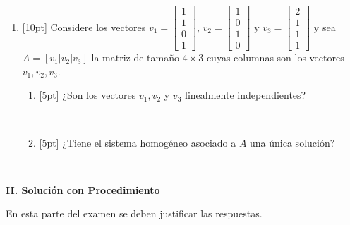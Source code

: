 \documentclass[11pt]{article}
\newcommand{\sino}{\fbox{Sí}\ \fbox{No}}
\begin{document}
\begin{enumerate}
\item{}[10pt] Considere los vectores $v_1 = \begin{bmatrix}1\\1\\0\\1\end{bmatrix}$, $v_2 = \begin{bmatrix}1\\0\\1\\0\end{bmatrix}$ y $v_3 = \begin{bmatrix}2\\1\\1\\1\end{bmatrix}$ y sea $A = [v_1|v_2|v_3]$ la matriz de tamaño $4\times 3$ cuyas columnas son los vectores $v_1,v_2,v_3$.
\begin{enumerate}
\item{}[5pt] ¿Son los vectores $v_1, v_2$ y $v_3$ linealmente independientes?

\vspace{4pt}
\sino

\item{}[5pt] ¿Tiene el sistema homogéneo asociado a $A$ una única solución?

\vspace{4pt}
\sino
\end{enumerate}
\end{enumerate}

\newpage
\noindent\textbf{\large II. Solución con Procedimiento}

\vspace{6pt}
\noindent En esta parte del examen se deben justificar las respuestas.
\end{document}
